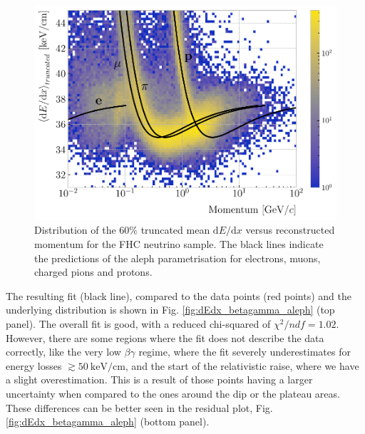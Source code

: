 \begin{figure}[t]
	\centering
	\includegraphics[width=.90\linewidth]{Images/GArSoft_PID/dEdx/dEdx_curves_with_fit.pdf}
	\caption[Distribution of the $60\%$ truncated mean $\mathrm{d}E/\mathrm{d}x$ versus reconstructed momentum for the FHC neutrino sample.]{Distribution of the $60\%$ truncated mean $\mathrm{d}E/\mathrm{d}x$ versus reconstructed momentum for the FHC neutrino sample. The black lines indicate the predictions of the \gls{aleph} parametrisation for electrons, muons, charged pions and protons.}
	\label{fig:dEdx_vs_momentum}
\end{figure}

The resulting fit (black line), compared to the data points (red points) and the underlying distribution is shown in Fig. \ref{fig:dEdx_betagamma_aleph} (top panel). The overall fit is good, with a reduced chi-squared of $\chi^{2}/ndf=1.02$. However, there are some regions where the fit does not describe the data correctly, like the very low $\beta\gamma$ regime, where the fit severely underestimates for energy losses $\gtrsim 50 ~ \mathrm{keV}/\mathrm{cm}$, and the start of the relativistic raise, where we have a slight overestimation. This is a result of those points having a larger uncertainty when compared to the ones around the dip or the plateau areas. These differences can be better seen in the residual plot, Fig. \ref{fig:dEdx_betagamma_aleph} (bottom panel).

